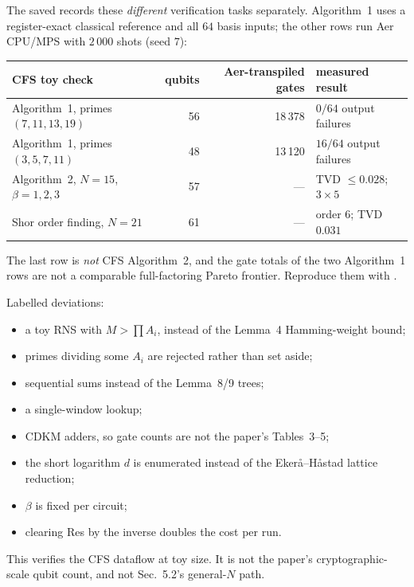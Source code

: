 \documentclass[11pt]{article}
\theoremstyle{plain}
\theoremstyle{remark}
\begin{document}
\begin{warnbox}[title={What is built, and what is not}]
The saved  records these \emph{different}
verification tasks separately. Algorithm~1 uses a register-exact
classical reference and all $64$ basis inputs; the other rows run
Aer CPU/MPS with $2\,000$ shots (seed $7$):
\begin{center}\footnotesize
\begin{tabular}{@{}lrrl@{}}
\toprule
CFS toy check & qubits & Aer-transpiled gates & measured result\\
\midrule
Algorithm~1, primes $(7,11,13,19)$ & 56 & 18\,378 & $0/64$ output failures\\
Algorithm~1, primes $(3,5,7,11)$ & 48 & 13\,120 & $16/64$ output failures\\
Algorithm~2, $N=15$, $\beta=1,2,3$ & 57 & --- & TVD $\leq0.028$; $3\times5$\\
Shor order finding, $N=21$ & 61 & --- & order $6$; TVD $0.031$\\
\bottomrule
\end{tabular}
\end{center}
The last row is \emph{not} CFS Algorithm~2, and the gate totals of
the two Algorithm~1 rows are not a comparable full-factoring Pareto
frontier. Reproduce them with
.

Labelled deviations:
\begin{itemize}
\item a toy RNS with $M>\prod A_i$, instead of the Lemma~4 Hamming-weight
  bound;
\item primes dividing some $A_i$ are rejected rather than set aside;
\item sequential sums instead of the Lemma~8/9 trees;
\item a single-window lookup;
\item CDKM adders, so gate counts are not the paper's Tables~3--5;
\item the short logarithm $d$ is enumerated instead of the
  Eker\aa--H\aa stad lattice reduction;
\item $\beta$ is fixed per circuit;
\item clearing Res by the inverse doubles the cost per run.
\end{itemize}
This verifies the CFS dataflow at toy size. It is not the paper's
cryptographic-scale qubit count, and not Sec.~5.2's general-$N$ path.


\end{warnbox}
\end{document}
